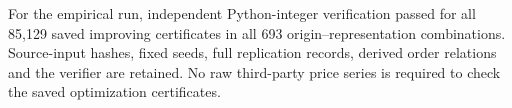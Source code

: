 For the empirical run, independent Python-integer verification passed for all 85,129 saved improving certificates in all 693 origin--representation combinations. Source-input hashes, fixed seeds, full replication records, derived order relations and the verifier are retained. No raw third-party price series is required to check the saved optimization certificates.
